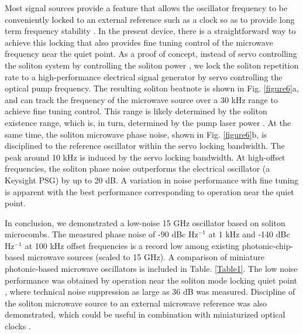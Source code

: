 \documentclass[noshowpacs,amsmath,
twocolumn,
superscriptaddress,
8pt,
aps,prb]{revtex4-2}
\begin{document}
\noindent Most signal sources provide a feature that allows the oscillator frequency to be conveniently locked to an external reference such as a clock so as to provide long term frequency stability \cite{newman2019architecture}.  In the present device, there is a straightforward way to achieve this locking that also provides fine tuning control of the microwave frequency near the quiet point.  As a proof of concept, instead of servo controlling the soliton system by controlling the soliton power \cite{yi2016active}, we lock the soliton repetition rate to a high-performance electrical signal generator by servo controlling the optical pump frequency. The resulting soliton beatnote is shown in Fig. \ref{figure6}a, and can track the frequency of the microwave source over a 30 kHz range to achieve fine tuning control. This range is likely determined by the soliton existence range, which is, in turn, determined by the pump laser power \cite{herr2014temporal}. At the same time, the soliton microwave phase noise, shown in Fig. \ref{figure6}b, is disciplined to the reference oscillator within the servo locking bandwidth. The peak around 10 kHz is induced by the servo locking bandwidth. At high-offset frequencies, the soliton phase noise outperforms the electrical oscillator (a Keysight PSG) by up to 20 dB. A variation in noise performance with fine tuning is apparent with the best performance corresponding to operation near the quiet point. 

\medskip


\noindent In conclusion, we demonstrated a low-noise 15 GHz oscillator based on soliton microcombs. The measured phase noise of -90 dBc Hz$^{-1}$ at 1 kHz and -140 dBc Hz$^{-1}$ at 100 kHz offset frequencies is a record low among existing photonic-chip-based microwave sources \cite{li2013microwave,tang2018integrated,do2020wideband,gundavarapu2019sub,liu2020photonic,jin2020hertz} (scaled to 15 GHz). A comparison of miniature photonic-based microwave oscillators is included in Table. \ref{Table1}. The low noise performance was obtained by operation near the soliton mode locking quiet point \cite{yi2017single}, where technical noise suppression as large as 36 dB was measured.  Discipline of the soliton microwave source to an external microwave reference was also demonstrated, which could be useful in combination with miniaturized optical clocks \cite{newman2019architecture}. 
\end{document}
